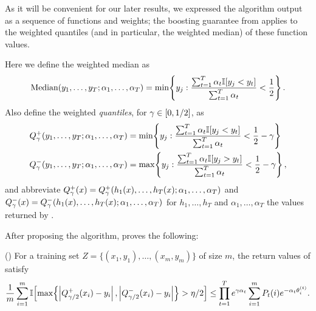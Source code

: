 \documentclass[12pt,a4paper,oneside,onecolumn]{book}
\begin{document}
As it will be convenient for our later results, we expressed
the algorithm output as a sequence
of functions and weights; 
the boosting guarantee from \citet{kegl2003robust} applies to the weighted quantiles (and in particular, the weighted median) of these function values.

\begin{sloppypar}
Here we define the weighted median as 
\begin{equation*}
\text{Median}(y_{1},\ldots,y_{T};\alpha_{1},\ldots,\alpha_{T}) = \min\!\left\{ y_{j} : \frac{\sum_{t=1}^{T} \alpha_{t} \mathbb{I}[ y_{j} < y_{t} ] }{\sum_{t=1}^{T} \alpha_{t}} < \frac{1}{2} \right\}.
\end{equation*}
Also define the weighted \emph{quantiles}, for $\gamma \in [0,1/2]$, as 
\begin{align*}
Q_{\gamma}^{+}(y_{1},\ldots,y_{T};\alpha_{1},\ldots,\alpha_{T}) & = \min\!\left\{ y_{j} : \frac{\sum_{t=1}^{T} \alpha_{t} \mathbb{I}[ y_{j} < y_{t} ] }{\sum_{t=1}^{T} \alpha_{t}} < \frac{1}{2} - \gamma \right\}
\\ Q_{\gamma}^{-}(y_{1},\ldots,y_{T};\alpha_{1},\ldots,\alpha_{T}) & = \max\!\left\{ y_{j} : \frac{\sum_{t=1}^{T} \alpha_{t} \mathbb{I}[ y_{j} > y_{t} ] }{\sum_{t=1}^{T} \alpha_{t}} < \frac{1}{2} - \gamma \right\},
\end{align*}
and abbreviate $Q_{\gamma}^{+}(x) = Q_{\gamma}^{+}(h_{1}(x),\ldots,h_{T}(x);\alpha_{1},\ldots,\alpha_{T})$ and $Q_{\gamma}^{-}(x) = Q_{\gamma}^{-}(h_{1}(x),\ldots,h_{T}(x);\alpha_{1},\ldots,\alpha_{T})$ 
for $h_{1},\ldots,h_{T}$ and $\alpha_{1},\ldots,\alpha_{T}$ the values returned by .
\end{sloppypar}




After proposing the algorithm, \citet{kegl2003robust} proves the following:

\begin{lemma}
\label{lem:kegl}
(\citet{kegl2003robust}) 
For a training set $Z = \{(x_{1},y_{1}),\ldots,(x_{m},y_{m})\}$ of size $m$, 
the return values of  satisfy 
\begin{equation*}
\frac{1}{m} \sum_{i=1}^{m} \mathbb{I}\!\left[ \max\!\left\{ \left| Q_{\gamma/2}^{+}(x_{i}) - y_{i} \right|, \left| Q_{\gamma/2}^{-}(x_{i}) - y_{i} \right| \right\} > \eta/2 \right] 
\leq \prod_{t=1}^{T} e^{\gamma \alpha_{t}} \sum_{i=1}^{m} P_{t}(i) e^{-\alpha_{t} \theta_{i}^{(t)}}.
\end{equation*}
\end{lemma}
\end{document}
